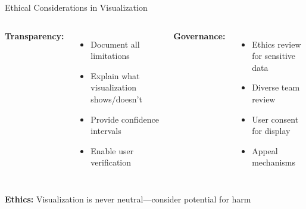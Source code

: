 \documentclass[aspectratio=169]{beamer}
\newcommand{\ethics}[1]{\colorbox{purple!10}{\textcolor{ethicscolor}{\textbf{Ethics:} #1}}}
\begin{document}
\begin{frame}{Ethical Considerations in Visualization}
\begin{columns}
\textbf{Transparency:}
\begin{itemize}
\item Document all limitations
\item Explain what visualization shows/doesn't
\item Provide confidence intervals
\item Enable user verification
\end{itemize}

\textbf{Governance:}
\begin{itemize}
\item Ethics review for sensitive data
\item Diverse team review
\item User consent for display
\item Appeal mechanisms
\end{itemize}
\end{columns}

\vspace{0.3cm}
\ethics{Visualization is never neutral—consider potential for harm}
\end{frame}
\end{document}
